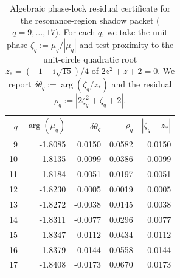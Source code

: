 \begin{table}[H]
\centering
\scriptsize
\setlength{\tabcolsep}{6pt}
\caption{Algebraic phase-lock residual certificate for the resonance-region shadow packet ($q=9,\dots,17$). For each $q$, we take the unit phase $\zeta_q:=\mu_q/|\mu_q|$ and test proximity to the unit-circle quadratic root $z_\ast=(-1-\mathrm{i}\sqrt{15})/4$ of $2z^2+z+2=0$. We report $\delta\theta_q:=\arg(\zeta_q/z_\ast)$ and the residual $\rho_q:=|2\zeta_q^2+\zeta_q+2|$.}
\label{tab:fold_collision_shadow_spectral_packet_algebraic_phase_residual_q9_17}
\begin{tabular}{r r r r r}
\toprule
$q$ & $\arg(\mu_q)$ & $\delta\theta_q$ & $\rho_q$ & $|\zeta_q-z_\ast|$\\
\midrule
9 & -1.8085 & 0.0150 & 0.0582 & 0.0150\\
10 & -1.8135 & 0.0099 & 0.0386 & 0.0099\\
11 & -1.8184 & 0.0051 & 0.0197 & 0.0051\\
12 & -1.8230 & 0.0005 & 0.0019 & 0.0005\\
13 & -1.8272 & -0.0038 & 0.0145 & 0.0038\\
14 & -1.8311 & -0.0077 & 0.0296 & 0.0077\\
15 & -1.8347 & -0.0112 & 0.0434 & 0.0112\\
16 & -1.8379 & -0.0144 & 0.0558 & 0.0144\\
17 & -1.8408 & -0.0173 & 0.0670 & 0.0173\\
\bottomrule
\end{tabular}
\end{table}
